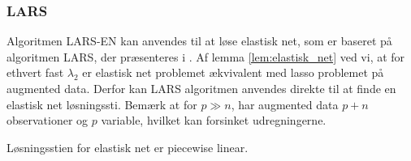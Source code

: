 %


\subsubsection{LARS}
Algoritmen LARS-EN kan anvendes til at løse elastisk net, som er baseret på algoritmen LARS, der præsenteres i \cite{efron}.
Af lemma \ref{lem:elastisk_net} ved vi, at for ethvert fast \(\lambda_2\) er elastisk net problemet ækvivalent med lasso problemet på augmented data.
Derfor kan LARS algoritmen anvendes direkte til at finde en elastisk net løsningssti.
Bemærk at for \(p \gg n\), har augmented data \(p+n\) observationer og \(p\) variable, hvilket kan forsinket udregningerne.


Løsningsstien for elastisk net er piecewise linear.
\newpage

